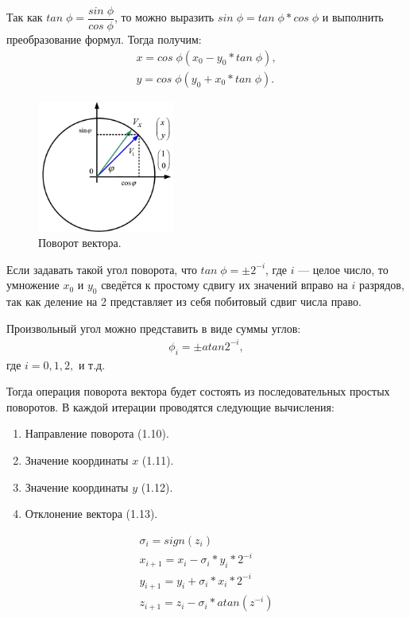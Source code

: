 	Так как $tan\;\phi=\dfrac{sin\;\phi}{cos\;\phi}$, то можно выразить $sin\;\phi=tan\;\phi*cos\;\phi$ и выполнить преобразование формул. Тогда получим:
	\begin{gather}
	x=cos\;\phi(x_{0}-y_{0}*tan\;\phi), \\
	y=cos\;\phi(y_{0}+x_{0}*tan\;\phi). 
	\end{gather}
	
	\begin{figure}[H]
    \centering
    \includegraphics[width=0.4\textwidth]{../image/cordic2.png}
    \caption{Поворот вектора.}
	\end{figure}

	Если задавать такой угол поворота, что $tan\;\phi = \pm 2^{-i}$, где $i$ --- целое число, то умножение $x_{0}$ и $y_{0}$ сведётся к простому сдвигу их значений вправо на $i$ разрядов, так как деление на 2 представляет из себя побитовый сдвиг числа право.

	Произвольный угол можно представить в виде суммы углов:
	\begin{gather}
	\phi_{i}=\pm atan2^{-i}, 
	\end{gather}	
	где $i = 0, 1, 2,$ и т.д.

	Тогда операция поворота вектора будет состоять из последовательных простых поворотов. В каждой итерации проводятся следующие вычисления:
	\begin{enumerate}
	\item Направление поворота (1.10).
	\item Значение координаты $x$ (1.11).
	\item Значение координаты $y$ (1.12).
	\item Отклонение вектора	(1.13).
	\end{enumerate}
	\begin{gather}
	\sigma_{i} 	= sign(z_{i}) \\
	x_{i+1} = x_{i} - \sigma_{i}*y_{i}*2^{-i} \\
	y_{i+1} = y_{i} + \sigma_{i}*x_{i}*2^{-i} \\
	z_{i+1} = z_{i} - \sigma_{i}*atan(z^{-i}) 
	\end{gather}
	
